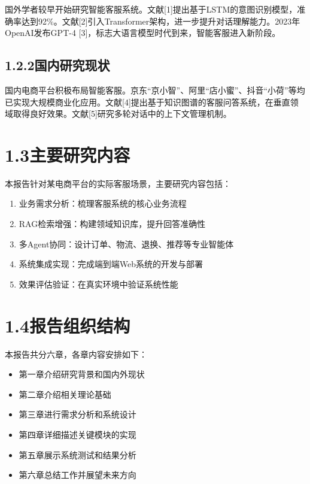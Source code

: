 \documentclass{harryopo-report}
\begin{document}
国外学者较早开始研究智能客服系统。文献[1]提出基于LSTM的意图识别模型，准确率达到92\%。文献[2]引入Transformer架构，进一步提升对话理解能力。2023年OpenAI发布GPT-4 [3]，标志大语言模型时代到来，智能客服进入新阶段。

\subsection*{1.2.2国内研究现状}

国内电商平台积极布局智能客服。京东“京小智”、阿里“店小蜜”、抖音“小荷”等均已实现大规模商业化应用。文献[4]提出基于知识图谱的客服问答系统，在垂直领域取得良好效果。文献[5]研究多轮对话中的上下文管理机制。

\section*{1.3主要研究内容}

本报告针对某电商平台的实际客服场景，主要研究内容包括：

\begin{enumerate}
  \item {\fzht 业务需求分析}：梳理客服系统的核心业务流程
  \item {\fzht RAG检索增强}：构建领域知识库，提升回答准确性
  \item {\fzht 多Agent协同}：设计订单、物流、退换、推荐等专业智能体
  \item {\fzht 系统集成实现}：完成端到端Web系统的开发与部署
  \item {\fzht 效果评估验证}：在真实环境中验证系统性能
\end{enumerate}

\section*{1.4报告组织结构}

本报告共分六章，各章内容安排如下：

\begin{itemize}
  \item 第一章介绍研究背景和国内外现状
  \item 第二章介绍相关理论基础
  \item 第三章进行需求分析和系统设计
  \item 第四章详细描述关键模块的实现
  \item 第五章展示系统测试和结果分析
  \item 第六章总结工作并展望未来方向
\end{itemize}
\end{document}
